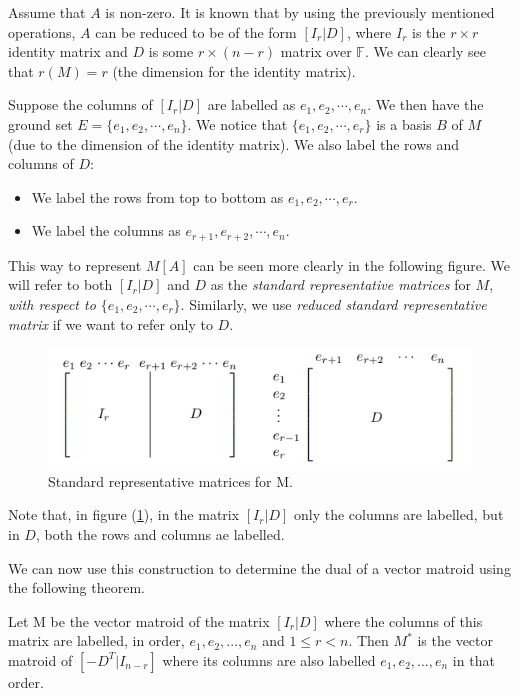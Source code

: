 Assume that $A$ is non-zero. It is known that by using the previously mentioned operations, $A$ can be reduced to be of the form $[I_r|D]$, where $I_r$ is the $r \times r$ identity matrix and $D$ is some $r \times (n-r)$ matrix over $\mathbb{F}$. We can clearly see that $r(M)=r$ (the dimension for the identity matrix). 

Suppose the columns of $[I_r|D]$ are labelled as $e_1, e_2,\cdots,e_n$. We then have the ground set $E=\{e_1, e_2,\cdots,e_n\}$. We notice that $\{e_1, e_2,\cdots,e_r\}$ is a basis $B$ of $M$ (due to the dimension of the identity matrix). We also label the rows and columns of $D$:
\begin{itemize}
  \item We label the rows from top to bottom as $e_1, e_2,\cdots,e_r$.
  \item We label the columns as  $e_{r+1}, e_{r+2},\cdots,e_n$.
\end{itemize}

  This way to represent $M[A]$ can be seen more clearly in the following figure. We will refer to both $[I_r|D]$ and $D$ as the \textit{standard representative matrices} for $M$, \textit{with respect to $\{e_1, e_2,\cdots,e_r\}$}. Similarly, we use \textit{reduced standard representative matrix} if we want to refer only to $D$.

\begin{figure}[H]
    \centering
    \includegraphics{SRF.png}
    \caption{Standard representative matrices for M. \cite{oxley1}}
    \label{StandertRepMat}
\end{figure}
Note that, in figure (\ref{StandertRepMat}), in the matrix $[I_r|D]$ only the columns are labelled, but in $D$, both the rows and columns ae labelled.

We can now use this construction to determine the dual of a vector matroid using the following theorem.

\begin{theorem}\label{DualRepMat}
    Let M be the vector matroid of the matrix $[I_r|D]$ where the columns of this matrix are labelled, in order, $e_1, e_2,...,e_n$ and $1\leq r< n$. Then $M^*$ is the vector matroid of $[-D^T|I_{n-r}]$ where its columns are also labelled $e_1, e_2,...,e_n$ in that order.
\end{theorem}

